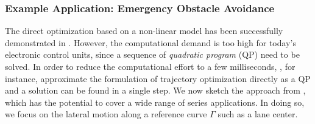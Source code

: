 \subsubsection{Example Application: Emergency Obstacle Avoidance}\label{S:57.3.2.2}
\newcommand{\mat}{\bs} %
The direct optimization based on a non-linear model has been successfully demonstrated in \cite{werling2012cdc}. However, the computational demand is too high for today's electronic control units, since a sequence of \emph{quadratic program} (QP) need to be solved. In order to reduce the computational effort to a few milliseconds, \cite{Falcone2007, carvalho2013predictive}, for instance, approximate the formulation of trajectory optimization directly as a QP and a solution can be found in a single step. We now sketch the approach from \cite{gutjahr2016lateral}, which has the potential to cover a wide range of series applications.
In doing so, we focus on the lateral motion along a reference curve $\Gamma$ such as a lane center. 

